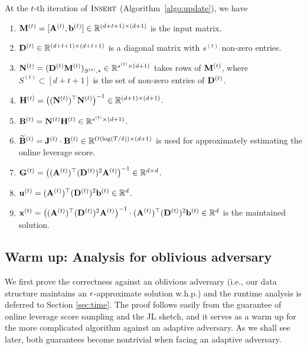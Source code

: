 \begin{lemma}
\label{lem:close_form_formula_algorithm}
At the $t$-th iteration of $\textsc{Insert}$ (Algorithm~\ref{algo:update}), we have
\begin{enumerate}
    \item $\mathbf{M}^{(t)} = [\mathbf{A}^{(t)}, \mathbf{b}^{(t)}] \in \mathbb{R}^{(d+t+1) \times (d+1)}$ is the input matrix.
    \item $\mathbf{D}^{(t)} \in \mathbb{R}^{(d+t+1) \times (d+t+1)}$ is a diagonal matrix with $s^{(t)}$ non-zero entries.
    \item $\mathbf{N}^{(t)} = (\mathbf{D}^{(t)} \mathbf{M}^{(t)})_{S^{(t)}, *} \in \mathbb{R}^{s^{(t)} \times (d+1)}$ takes rows of $\mathbf{M}^{(t)}$, where $S^{(t)} \subset [d+t+1]$ is the set of non-zero entries of $\mathbf{D}^{(t)}$.
    \item $\mathbf{H}^{(t)} = \big( (\mathbf{N}^{(t)})^{\top} \mathbf{N}^{(t)} \big)^{-1} \in \mathbb{R}^{(d+1) \times (d+1)}$.
    \item $\mathbf{B}^{(t)} = \mathbf{N}^{(t)} \mathbf{H}^{(t)} \in \mathbb{R}^{s^{(t)} \times (d+1)}$.
    \item $\widetilde{\mathbf{B}}^{(t)} = \mathbf{J}^{(t)} \cdot \mathbf{B}^{(t)} \in \mathbb{R}^{O(\log(T/\delta)) \times (d+1)}$ is used for approximately estimating the online leverage score.
    \item $\mathbf{G}^{(t)} = \big( (\mathbf{A}^{(t)})^{\top} (\mathbf{D}^{(t)})^2 \mathbf{A}^{(t)} \big)^{-1} \in \mathbb{R}^{d \times d}$.
    \item $\mathbf{u}^{(t)} = (\mathbf{A}^{(t)})^{\top}(\mathbf{D}^{(t)})^2 \mathbf{b}^{(t)} \in \mathbb{R}^d$.
    \item $\mathbf{x}^{(t)} = \big( (\mathbf{A}^{(t)})^{\top} (\mathbf{D}^{(t)})^2 \mathbf{A}^{(t)} \big)^{-1} \cdot (\mathbf{A}^{(t)})^{\top} (\mathbf{D}^{(t)})^2 \mathbf{b}^{(t)} \in \mathbb{R}^d$ is the maintained solution. 
\end{enumerate}
\end{lemma}





\subsection{Warm up: Analysis for oblivious adversary}
\label{sec:correct-oblivious}

We first prove the correctness against an oblivious adversary (i.e., our data structure maintains an $\epsilon$-approximate solution w.h.p.) and the runtime analysis is deferred to Section \ref{sec:time}.
The proof follows easily from the guarantee of online leverage score sampling \cite{cmp20} and the JL sketch, and it serves as a warm up for the more complicated algorithm against an adaptive adversary.
As we shall see later, both guarantees become nontrivial when facing an adaptive adversary.





